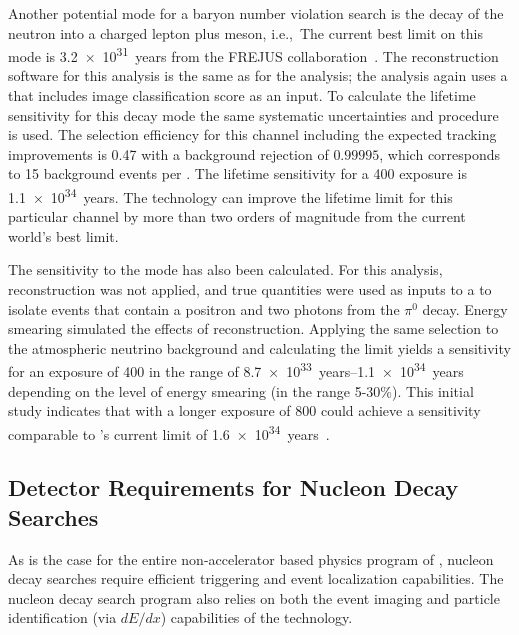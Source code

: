 Another potential mode for a baryon number violation search is the decay of the neutron into a charged lepton plus meson, i.e.,~\ntoek The current best limit on this mode is \SI{3.2e31}{years} from the FREJUS collaboration~\cite{Berger:1991fa}. The reconstruction software for this analysis is the same as for the \ptoknubar analysis; the analysis again uses a  that includes image classification score as an input. To calculate the lifetime sensitivity for this decay mode the same systematic uncertainties and procedure is used. The selection efficiency for this channel including the expected tracking improvements is \num{0.47}
with a background rejection of 
$0.99995$,
which corresponds to \num{15} background events per \si{\Mtyr}. The lifetime sensitivity for a \SI{400}{\ktyr} exposure is \SI{1.1e34}{years}. 
The   technology can improve the lifetime limit for this particular channel by more than two orders of magnitude from the current world's best limit.

The sensitivity to the \ptoepizero mode has also been calculated. For this analysis, reconstruction was not applied, and true quantities were used as inputs to a  to isolate events that contain a positron and two photons from the $\pi^0$ decay.  Energy smearing simulated the effects of reconstruction.  Applying the same selection to the atmospheric neutrino background and calculating the limit yields a sensitivity for an exposure of \SI{400}{\ktyr} in the range of \SIrange{8.7e33}{1.1e34}{years} depending on the level of energy smearing (in the range 5-30\%).  This initial study indicates that with a longer exposure of \SI{800}{\ktyr}  could achieve a sensitivity comparable to \superk's current limit of \SI{1.6e34}{years}~\cite{Miura:2016krn}.

\subsection{Detector Requirements for Nucleon Decay Searches}
\label{subsec:nonaccel-ndk-requirements}

As is the case for the entire  non-accelerator 
based physics program of , nucleon decay searches require 
efficient triggering and event localization  
capabilities. The nucleon decay search program also relies 
on both the event imaging and particle identification 
(via $dE/dx$) capabilities of the  technology.  

